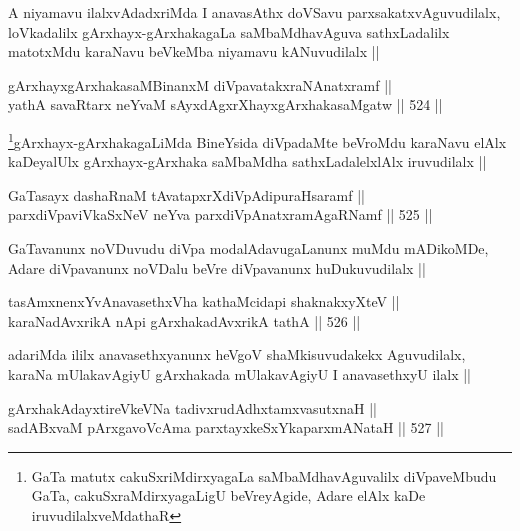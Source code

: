 \begin{artha}
A niyamavu ilalxvAdadxriMda I anavasAthx doVSavu parxsakatxvAguvudilalx, loVkadalilx gArxhayx-gArxhakagaLa saMbaMdhavAguva sathxLadalilx matotxMdu karaNavu beVkeMba niyamavu kANuvudilalx ||
\end{artha}


\begin{shl}
gArxhayxgArxhakasaMBinanxM diVpavatakxraNAnatxramf || \\
yathA savaRtarx neYvaM sAyxdAgxrXhayxgArxhakasaMgatw ||  524 ||  
\end{shl}

\begin{artha}
\footnote{GaTa matutx cakuSxriMdirxyagaLa saMbaMdhavAguvalilx diVpaveMbudu GaTa, cakuSxraMdirxyagaLigU beVreyAgide, Adare elAlx kaDe iruvudilalxveMdathaR}gArxhayx-gArxhakagaLiMda BineYsida diVpadaMte beVroMdu karaNavu elAlx kaDeyalUlx gArxhayx-gArxhaka saMbaMdha sathxLadalelxlAlx iruvudilalx ||
\end{artha}


\begin{shl}
GaTasayx dashaRnaM tAvatapxrXdiVpAdipuraHsaramf ||  \\
parxdiVpaviVkaSxNeV neYva parxdiVpAnatxramAgaRNamf ||  525 ||  
\end{shl}

\begin{artha}
GaTavanunx noVDuvudu diVpa modalAdavugaLanunx muMdu mADikoMDe, Adare diVpavanunx noVDalu beVre diVpavanunx huDukuvudilalx ||
\end{artha}

\begin{shl}
tasAmxnenxYvAnavasethxVha kathaMcidapi shaknakxyXteV || \\
karaNadAvxrikA nApi gArxhakadAvxrikA tathA ||  526 ||  
\end{shl}

\begin{artha}
adariMda ililx anavasethxyanunx heVgoV shaMkisuvudakekx Aguvudilalx, karaNa mUlakavAgiyU gArxhakada mUlakavAgiyU I anavasethxyU ilalx ||
\end{artha}


\begin{shl}
gArxhakAdayxtireVkeVNa tadivxrudAdhxtamxvasutxnaH ||  \\
sadABxvaM pArxgavoVcAma parxtayxkeSxYkaparxmANataH ||  527 ||  
\end{shl}

